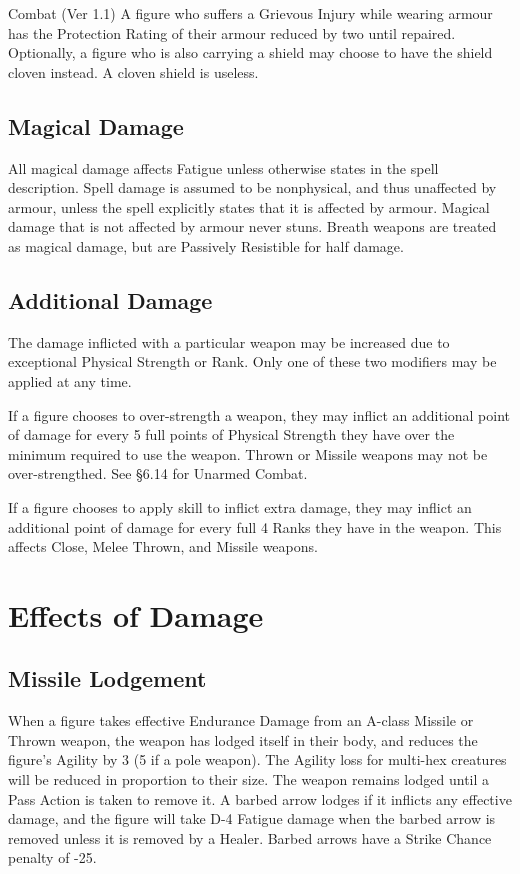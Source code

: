 \begin{Chapter}{Combat (Ver 1.1)}
A figure who suffers a Grievous Injury while wearing armour has the
Protection Rating of their armour reduced by two until repaired.
Optionally, a figure who is also carrying a shield may choose to have
the shield cloven instead.  A cloven shield is useless.

\subsection{Magical Damage}

All magical damage affects Fatigue unless otherwise states in the
spell description. Spell damage is assumed to be nonphysical, and thus
unaffected by armour, unless the spell explicitly states that it is
affected by armour.  Magical damage that is not affected by armour
never stuns.  Breath weapons are treated as magical damage, but are
Passively Resistible for half damage.

\subsection{Additional Damage}

The damage inflicted with a particular weapon may be increased due to
exceptional Physical Strength or Rank.  Only one of these two
modifiers may be applied at any time.

If a figure chooses to over-strength a weapon, they may inflict an
additional point of damage for every 5 full points of Physical
Strength they have over the minimum required to use the weapon.
Thrown or Missile weapons may not be over-strengthed.  See §6.14 for
Unarmed Combat.

If a figure chooses to apply skill to inflict extra damage, they may
inflict an additional point of damage for every full 4 Ranks they have
in the weapon.  This affects Close, Melee Thrown, and Missile weapons.

\section{Effects of Damage}

\subsection{Missile Lodgement}

When a figure takes effective Endurance Damage from an A-class Missile
or Thrown weapon, the weapon has lodged itself in their body, and
reduces the figure’s Agility by 3 (5 if a pole weapon). The Agility
loss for multi-hex creatures will be reduced in proportion to their
size.  The weapon remains lodged until a Pass Action is taken to
remove it. A barbed arrow lodges if it inflicts any effective damage,
and the figure will take D-4 Fatigue damage when the barbed arrow is
removed unless it is removed by a Healer. Barbed arrows have a Strike
Chance penalty of -25.


\end{Chapter}
